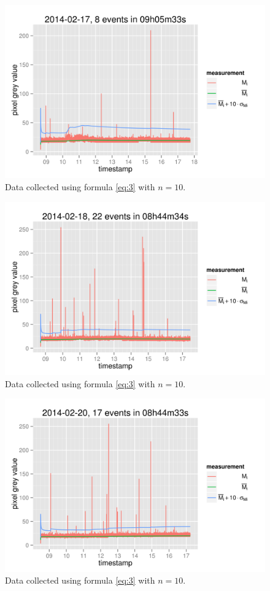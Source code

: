 \documentclass[a4paper,12pt]{article}
\begin{document}
\begin{figure}[h!]
  \centering
  \includegraphics{20140217.png}
  \caption{Data collected using formula \ref{eq:3} with $n=10$.}
\end{figure}

\begin{figure}[h!]
  \centering
  \includegraphics{20140218.png}
  \caption{Data collected using formula \ref{eq:3} with $n=10$.}
\end{figure}

\begin{figure}[h!]
  \centering
  \includegraphics{20140220.png}
  \caption{Data collected using formula \ref{eq:3} with $n=10$.}
\end{figure}
\end{document}
